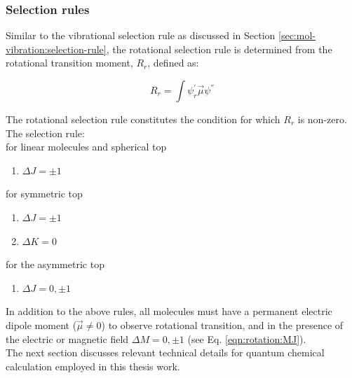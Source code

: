 \subsubsection{Selection rules}
\label{sec:mol-rotation:selection-rule}

Similar to the vibrational selection rule as discussed in Section \ref{sec:mol-vibration:selection-rule}, the rotational selection rule is determined from the rotational transition moment, $R_r$, defined as:

\[R_r = \int \psi_r^{'} \Vec{\mu} \psi^{''}\]

The rotational selection rule constitutes the condition for which $R_r$ is non-zero.\\

The selection rule:\\

for linear molecules and spherical top

\begin{enumerate}
\item $\Delta J = \pm 1$
\end{enumerate}

for symmetric top

\begin{enumerate}
\item $\Delta J = \pm 1$
\item $\Delta K = 0$
\end{enumerate}

for the asymmetric top

\begin{enumerate}
\item $\Delta J = 0, \pm 1$
\end{enumerate}

In addition to the above rules, all molecules must have a permanent electric dipole moment ($\Vec{\mu} \neq 0$) to observe rotational transition, and in the presence of the electric or magnetic field $\Delta M = 0, \pm 1$ (see Eq. \ref{eqn:rotation:MJ}).\\

The next section discusses relevant technical details for quantum chemical calculation employed in this thesis work.
